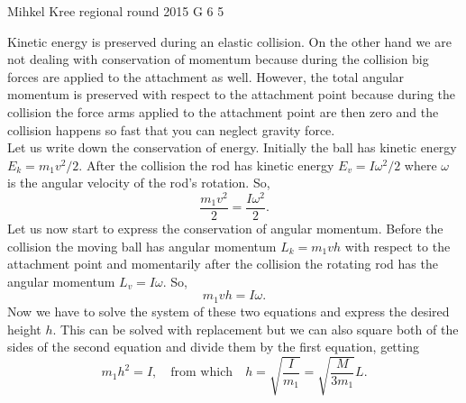 \documentclass[11pt]{article}
\begin{document}
{Mihkel Kree} %
{regional round} %
{2015} %
{G 6} %
{5} %
{

\ifEngSolution
Kinetic energy is preserved during an elastic collision. On the other hand we are not dealing with conservation of momentum because during the collision big forces are applied to the attachment as well. However, the total angular momentum is preserved with respect to the attachment point because during the collision the force arms applied to the attachment point are then zero and the collision happens so fast that you can neglect gravity force.\\
Let us write down the conservation of energy. Initially the ball has kinetic energy $E_k=m_1v^2/2$. After the collision the rod has kinetic energy $E_v=I\omega^2/2$ where $\omega$ is the angular velocity of the rod’s rotation. So,
\[
\frac{m_1v^2}{2}=\frac{I\omega^2}{2}.
\] 
Let us now start to express the conservation of angular momentum. Before the collision the moving ball has angular momentum $L_k=m_1vh$ with respect to the attachment point and momentarily after the collision the rotating rod has the angular momentum $L_v=I\omega$. So,
\[
m_1vh=I\omega.
\]
Now we have to solve the system of these two equations and express the desired height $h$. This can be solved with replacement but we can also square both of the sides of the second equation and divide them by the first equation, getting
\[
m_1h^2 = I,\quad \text{from which} \quad h = \sqrt{\frac{I}{m_1}}=\sqrt{\frac{M}{3m_1}}L.
\]
\fi
}
\end{document}
